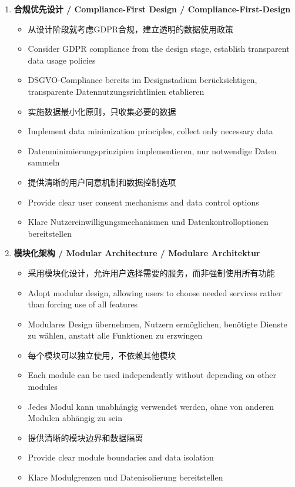 \documentclass[11pt,a4paper]{article}
\begin{document}
\begin{enumerate}
    \item \textbf{合规优先设计 / Compliance-First Design / Compliance-First-Design}
    \begin{itemize}
        \item 从设计阶段就考虑GDPR合规，建立透明的数据使用政策
        \item Consider GDPR compliance from the design stage, establish transparent data usage policies
        \item DSGVO-Compliance bereits im Designstadium berücksichtigen, transparente Datennutzungsrichtlinien etablieren
        \item 实施数据最小化原则，只收集必要的数据
        \item Implement data minimization principles, collect only necessary data
        \item Datenminimierungsprinzipien implementieren, nur notwendige Daten sammeln
        \item 提供清晰的用户同意机制和数据控制选项
        \item Provide clear user consent mechanisms and data control options
        \item Klare Nutzereinwilligungsmechanismen und Datenkontrolloptionen bereitstellen
    \end{itemize}
    
    \item \textbf{模块化架构 / Modular Architecture / Modulare Architektur}
    \begin{itemize}
        \item 采用模块化设计，允许用户选择需要的服务，而非强制使用所有功能
        \item Adopt modular design, allowing users to choose needed services rather than forcing use of all features
        \item Modulares Design übernehmen, Nutzern ermöglichen, benötigte Dienste zu wählen, anstatt alle Funktionen zu erzwingen
        \item 每个模块可以独立使用，不依赖其他模块
        \item Each module can be used independently without depending on other modules
        \item Jedes Modul kann unabhängig verwendet werden, ohne von anderen Modulen abhängig zu sein
        \item 提供清晰的模块边界和数据隔离
        \item Provide clear module boundaries and data isolation
        \item Klare Modulgrenzen und Datenisolierung bereitstellen
    \end{itemize}
    

\end{enumerate}
\end{document}
